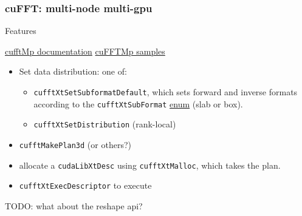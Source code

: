 \documentclass[10pt,aspectratio=169]{beamer}
\begin{document}
\begin{frame}[fragile]
  \frametitle{cuFFT: multi-node multi-gpu}

  \begin{center}Features\end{center}
    
  \href{https://docs.nvidia.com/hpc-sdk/cufftmp/index.html}{cufftMp documentation}
  \href{https://github.com/NVIDIA/CUDALibrarySamples/tree/master/cuFFTMp}{cuFFTMp samples}

  
  
  \medskip

  \begin{itemize}
  \item Set data distribution: one of:
    \begin{itemize}
    \item \lstinline{cufftXtSetSubformatDefault}, which sets forward and inverse formats according to the \lstinline{cufftXtSubFormat} \href{https://docs.nvidia.com/hpc-sdk/cufftmp/api/index.html#c.cufftXtSubFormat}{enum} (slab or box).
    \item \lstinline{cufftXtSetDistribution} (rank-local)
    \end{itemize}
  \item \lstinline{cufftMakePlan3d} (or others?)
  \item allocate a \lstinline{cudaLibXtDesc} using
    \lstinline{cufftXtMalloc}, which takes the plan.
  \item \lstinline{cufftXtExecDescriptor} to execute
  \end{itemize}

  TODO: what about the reshape api?
  
\end{frame}
\end{document}
